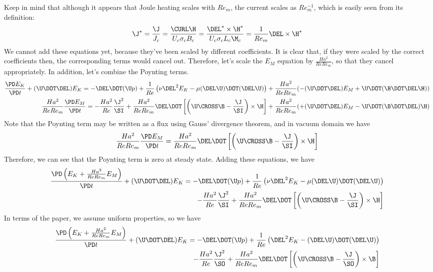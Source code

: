 \documentclass[11pt]{article}
\begin{document}
Keep in mind that although it appears that Joule heating scales with $Re_m$, the current scales as $Re_m^{-1}$, which is easily seen from its definition:
\begin{equation}
	\J^* = \frac{\J}{J_c} = \frac{\CURL \H}{U_c \sigma_c B_c} = \frac{\DEL^* \times \H^*}{U_c \sigma_c L_c \M_c} = \frac{1}{Re_m} \DEL \times \H^*
\end{equation}
We cannot add these equations yet, because they've been scaled by different coefficients. It is clear that, if they were scaled by the correct coefficients then, the corresponding terms would cancel out. Therefore, let's scale the $E_M$ equation by $\frac{Ha^2}{Re Re_m}$, so that they cancel appropriately. In addition, let's combine the Poynting terms.
\begin{equation}\begin{aligned}
	\frac{\PD E_K}{\PD t}
	+ (\U \DOT \DEL) E_K
	= 
	- \DEL \DOT (\U p)
	+ \frac{1}{Re} \left( \nu \DEL^2 E_K -  \mu (\DEL \U) \DOT (\DEL \U) \right)
	+ \frac{Ha^2}{Re Re_m} (  - (\U \DOT \DEL) E_M + \U \DOT (\B \DOT \DEL \H) )
	\\
	\frac{Ha^2}{Re Re_m} \frac{\PD E_M}{\PD t} = 
	- \frac{Ha^2}{Re} \frac{\J^2}{\SI}
	+ \frac{Ha^2}{Re Re_m} \DEL \DOT \left[\left(\U \CROSS \B - \frac{\J}{\SI} \right) \times \H \right]
	+ \frac{Ha^2}{Re Re_m} ( + (\U \DOT \DEL) E_M - \U \DOT (\B \DOT \DEL) \H )
\end{aligned}\end{equation}
Note that the Poynting term may be written as a flux using Gauss' divergence theorem, and in vacuum domain we have
\begin{equation}\begin{aligned}
	\frac{Ha^2}{Re Re_m} \frac{\PD E_M}{\PD t} = 
	\frac{Ha^2}{Re Re_m} \DEL \DOT \left[\left(\U \CROSS \B - \frac{\J}{\SI} \right) \times \H \right]
\end{aligned}\end{equation}
Therefore, we can see that the Poynting term is zero at steady state. Adding these equations, we have
\begin{equation}\begin{aligned}
	\frac{\PD \left( E_K + \frac{Ha^2}{Re Re_m} E_M \right)}{\PD t}
	+ (\U \DOT \DEL) E_K
	= 
	- \DEL \DOT (\U p)
	+ \frac{1}{Re} \left( \nu \DEL^2 E_K -  \mu (\DEL \U) \DOT (\DEL \U) \right) \\
	- \frac{Ha^2}{Re} \frac{\J^2}{\SI}
	+ \frac{Ha^2}{Re Re_m} \DEL \DOT \left[\left(\U \CROSS \B - \frac{\J}{\SI} \right) \times \H \right]
\end{aligned}\end{equation}
In terms of the paper, we assume uniform properties, so we have
\begin{equation}\begin{aligned}
	\frac{\PD \left( E_K + \frac{Ha^2}{Re Re_m} E_M \right)}{\PD t}
	+ (\U \DOT \DEL) E_K
	= 
	- \DEL \DOT (\U p)
	+ \frac{1}{Re} \left( \DEL^2 E_K - (\DEL \U) \DOT (\DEL \U) \right) \\
	- \frac{Ha^2}{Re} \frac{\J^2}{\SO}
	+ \frac{Ha^2}{Re Re_m} \DEL \DOT \left[\left(\U \CROSS \B - \frac{\J}{\SO} \right) \times \B \right]
\end{aligned}\end{equation}
\end{document}
